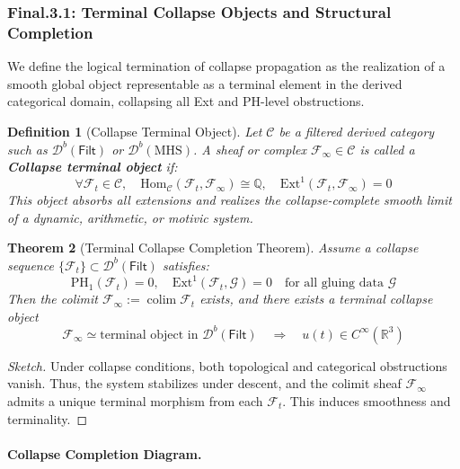 \documentclass[11pt]{article}
\DeclareMathOperator{\colim}{colim}
\newtheorem{theorem}{Theorem}[section]
\newtheorem{definition}[theorem]{Definition}
\begin{document}
\begin{axiom}
\begin{axiom}
{{\subsubsection*{Final.3.1: Terminal Collapse Objects and Structural Completion}

We define the logical termination of collapse propagation as the realization of a smooth global object  
representable as a terminal element in the derived categorical domain, collapsing all Ext and PH-level obstructions.

\begin{definition}[Collapse Terminal Object]
Let \( \mathcal{C} \) be a filtered derived category such as \( \mathcal{D}^b(\mathsf{Filt}) \) or \( \mathcal{D}^b(\mathrm{MHS}) \).  
A sheaf or complex \( \mathcal{F}_\infty \in \mathcal{C} \) is called a \textbf{Collapse terminal object} if:
\[
\forall \mathcal{F}_t \in \mathcal{C}, \quad 
\mathrm{Hom}_{\mathcal{C}}(\mathcal{F}_t, \mathcal{F}_\infty) \cong \mathbb{Q}, \quad 
\mathrm{Ext}^1(\mathcal{F}_t, \mathcal{F}_\infty) = 0
\]
This object absorbs all extensions and realizes the collapse-complete smooth limit  
of a dynamic, arithmetic, or motivic system.
\end{definition}

\begin{theorem}[Terminal Collapse Completion Theorem]
Assume a collapse sequence \( \{\mathcal{F}_t\} \subset \mathcal{D}^b(\mathsf{Filt}) \) satisfies:
\[
\mathrm{PH}_1(\mathcal{F}_t) = 0, \quad 
\mathrm{Ext}^1(\mathcal{F}_t, \mathcal{G}) = 0 \quad \text{for all gluing data } \mathcal{G}
\]
Then the colimit \( \mathcal{F}_\infty := \colim \mathcal{F}_t \) exists, and there exists a terminal collapse object  
\[
\mathcal{F}_\infty \simeq \text{terminal object in } \mathcal{D}^b(\mathsf{Filt})
\quad \Rightarrow \quad u(t) \in C^\infty(\mathbb{R}^3)
\]
\end{theorem}

\begin{proof}[Sketch]
Under collapse conditions, both topological and categorical obstructions vanish.  
Thus, the system stabilizes under descent, and the colimit sheaf \( \mathcal{F}_\infty \) admits a unique terminal morphism from each \( \mathcal{F}_t \).  
This induces smoothness and terminality.
\end{proof}

\paragraph{Collapse Completion Diagram.}

}}
\end{axiom}
\end{axiom}
\end{document}

